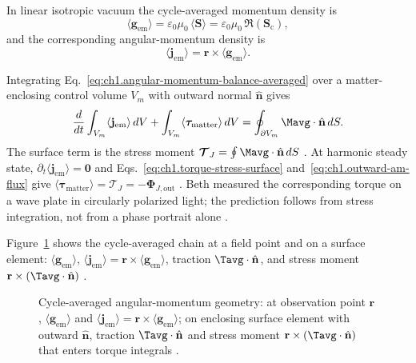 In linear isotropic vacuum the cycle-averaged momentum density is
\begin{equation}
\label{eq:ch1.rotation-generator-split}
\langle\mathbf{g}_{\mathrm{em}}\rangle=\varepsilon_0\mu_0\,\langle\mathbf{S}\rangle
=\varepsilon_0\mu_0\,\Re(\mathbf{S}_\mathrm{c}),
\end{equation}
and the corresponding angular-momentum density is
\begin{equation}
\label{eq:ch1.angular-momentum-density}
\langle\mathbf{j}_{\mathrm{em}}\rangle=\mathbf{r}\times\langle\mathbf{g}_{\mathrm{em}}\rangle.
\end{equation}
\addtocounter{equation}{-1}\label{eq:ch1.angular-density-split}%

Integrating Eq.~\eqref{eq:ch1.angular-momentum-balance-averaged} over a matter-enclosing control volume $V_m$ with outward normal $\hat{\mathbf{n}}$ gives
\begin{equation}
\label{eq:ch1.angular-balance-integral}
\frac{d}{dt}\int_{V_m} \langle\mathbf{j}_{\mathrm{em}}\rangle\,dV
+\int_{V_m} \langle\boldsymbol{\tau}_{\mathrm{matter}}\rangle\,dV
=\oint_{\partial V_m}\Mavg\cdot\hat{\mathbf{n}}\,dS.
\end{equation}
The surface term is the stress moment $\boldsymbol{\mathcal{T}}_J=\oint\Mavg\cdot\hat{\mathbf{n}}\,dS$ \cite{stratton1941}. At harmonic steady state, $\partial_t\langle\mathbf{j}_{\mathrm{em}}\rangle=\mathbf{0}$ and Eqs.~\eqref{eq:ch1.torque-stress-surface} and~\eqref{eq:ch1.outward-am-flux} give $\langle\boldsymbol{\tau}_{\mathrm{matter}}\rangle=\boldsymbol{\mathcal{T}}_J=-\boldsymbol{\Phi}_{J,\mathrm{out}}$ \cite{beth1936}. Beth \cite{beth1936} measured the corresponding torque on a wave plate in circularly polarized light; the prediction follows from stress integration, not from a phase portrait alone \cite{stratton1941}.

Figure~\ref{fig:ch1.momentum-angular-geometry} shows the cycle-averaged chain at a field point and on a surface element: $\langle\mathbf{g}_{\mathrm{em}}\rangle$, $\langle\mathbf{j}_{\mathrm{em}}\rangle=\mathbf{r}\times\langle\mathbf{g}_{\mathrm{em}}\rangle$, traction $\Tavg\cdot\hat{\mathbf{n}}$, and stress moment $\mathbf{r}\times(\Tavg\cdot\hat{\mathbf{n}})$ \cite{maxwell1873,beth1936}.

\begin{figure}[t]
\centering
\VolIPhysFigWide{\VolIPhysMomentumAngularGeometry}
\caption{Cycle-averaged angular-momentum geometry: at observation point $\mathbf{r}$, $\langle\mathbf{g}_{\mathrm{em}}\rangle$ and $\langle\mathbf{j}_{\mathrm{em}}\rangle=\mathbf{r}\times\langle\mathbf{g}_{\mathrm{em}}\rangle$; on enclosing surface element with outward $\hat{\mathbf{n}}$, traction $\Tavg\cdot\hat{\mathbf{n}}$ and stress moment $\mathbf{r}\times(\Tavg\cdot\hat{\mathbf{n}})$ that enters torque integrals \cite{maxwell1873,beth1936,stratton1941}.}
\label{fig:ch1.momentum-angular-geometry}
\end{figure}

